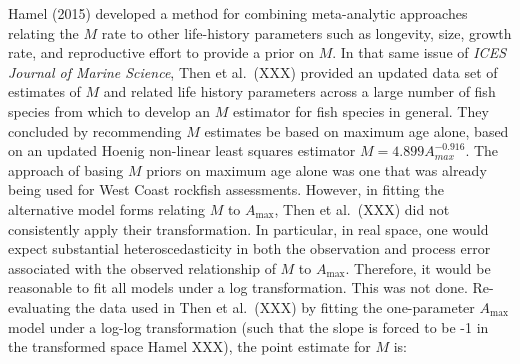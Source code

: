\documentclass[11pt,
  english,
  a4paper,
]{article}
\begin{document}
\leavevmode\tagmcend\tagstructend


Hamel {(2015)\leavevmode\tagmcend\tagstructend} developed a method for combining meta-analytic approaches relating the {\(M\)\leavevmode\tagmcend\tagstructend} rate to other life-history parameters such as longevity, size, growth rate, and reproductive effort to provide a prior on {\(M\)\leavevmode\tagmcend\tagstructend}. In that same issue of \emph{ICES Journal of Marine Science}, Then et al.~(XXX) provided an updated data set of estimates of {\(M\)\leavevmode\tagmcend\tagstructend} and related life history parameters across a large number of fish species from which to develop an {\(M\)\leavevmode\tagmcend\tagstructend} estimator for fish species in general. They concluded by recommending {\(M\)\leavevmode\tagmcend\tagstructend} estimates be based on maximum age alone, based on an updated Hoenig non-linear least squares estimator {\(M=4.899A^{-0.916}_{max}\)\leavevmode\tagmcend\tagstructend}. The approach of basing {\(M\)\leavevmode\tagmcend\tagstructend} priors on maximum age alone was one that was already being used for West Coast rockfish assessments. However, in fitting the alternative model forms relating {\(M\)\leavevmode\tagmcend\tagstructend} to {\(A_{\text{max}}\)\leavevmode\tagmcend\tagstructend}, Then et al.~(XXX) did not consistently apply their transformation. In particular, in real space, one would expect substantial heteroscedasticity in both the observation and process error associated with the observed relationship of {\(M\)\leavevmode\tagmcend\tagstructend} to {\(A_{\text{max}}\)\leavevmode\tagmcend\tagstructend}. Therefore, it would be reasonable to fit all models under a log transformation. This was not done. Re-evaluating the data used in Then et al.~(XXX) by fitting the one-parameter {\(A_{\text{max}}\)\leavevmode\tagmcend\tagstructend} model under a log-log transformation (such that the slope is forced to be -1 in the transformed space Hamel XXX), the point estimate for {\(M\)\leavevmode\tagmcend\tagstructend} is:
\end{document}
